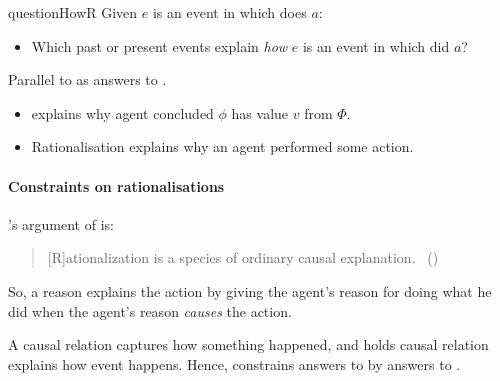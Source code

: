 \begin{note}
\begin{question}{questionHowR}{\qHowR{}}
    Given \(e\) is an event in which \vAgent{} does \(a\):

    \begin{itemize}
    \item
      Which past or present events explain \emph{how} \(e\) is an event in which \vAgent{} did \(a\)?
    \end{itemize}
    \vspace{-1.5\baselineskip}
  \end{question}

  \noindent%
  Parallel to \ros{} as answers to \qWhy{}.

  \begin{itemize}
  \item
    \ros{} explains why agent concluded \(\phi\) has value \(v\) from \(\Phi\).
  \item
    Rationalisation explains why an agent performed some action.
  \end{itemize}
\end{note}

\paragraph*{Constraints on rationalisations}

\begin{note}
  \citeauthor{Davidson:1963aa}'s argument of  is:
  \begin{quote}
    [R]ationalization is a species of ordinary causal explanation.%
    \mbox{ }\hfill\mbox{(\citeyear[685]{Davidson:1963aa})}
  \end{quote}
  So, a reason explains the action by giving the agent's reason for doing what he did when the agent's reason \emph{causes} the action.

  A causal relation captures how something happened, and \citeauthor{Davidson:1963aa} holds causal relation explains how event happens.
  Hence, \citeauthor{Davidson:1963aa} constrains answers to \qWhyR{} by answers to \qHowR{}.
\end{note}


